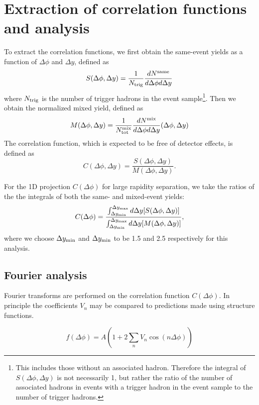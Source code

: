 \section{Extraction of correlation functions and analysis}\label{sec:corr}
To extract the correlation functions, we first obtain the same-event yields as a function of $\Delta \phi$ and $\Delta y$, defined as 
\begin{equation}
    S(\Delta\phi,\Delta y) = \frac{1}{N_{\rm trig}}\frac{dN^{\rm same}}{d\Delta \phi d\Delta y}
\end{equation}
where $N_{\rm trig}$ is the number of trigger hadrons in the event sample\footnote{This includes those without an associated hadron.  Therefore the integral of $S(\Delta\phi,\Delta y)$ is not necessarily 1, but rather the ratio of the number of associated hadrons in events with a trigger hadron in the event sample to the number of trigger hadrons.}.
Then we obtain the normalized mixed yield, defined as
\begin{equation}
    M(\Delta\phi,\Delta y) = \frac{1}{N^{\rm mix}_{\rm tot}}\frac{dN^{\rm mix}}{d\Delta \phi d\Delta y}(\Delta \phi,\Delta y)
\end{equation}
The correlation function, which is expected to be free of detector effects, is defined as 
\begin{equation}
    C(\Delta\phi,\Delta y) = \frac{S(\Delta\phi,\Delta y)}{M(\Delta\phi,\Delta y)}.
\end{equation}

For the 1D projection $C(\Delta\phi)$ for large rapidity separation, we take the ratios of the the integrals of both the same- and mixed-event yields:
\begin{equation}
    C(\Delta\phi) = \frac{\int_{\Delta y_{\rm min}}^{\Delta y_{\rm max}} d\Delta y  [S(\Delta\phi,\Delta y)]}{\int_{\Delta y_{\rm min}}^{\Delta y_{\rm max}} d\Delta y [M(\Delta\phi,\Delta y)]},
\end{equation}
where we choose $\Delta y_{\rm min}$ and $\Delta y_{\rm min}$ to be 1.5 and 2.5 respectively for this analysis.  
\subsection{Fourier analysis}
\label{sec:fourier}
Fourier transforms are performed on the correlation function $C(\Delta\phi)$.  In principle the coefficients $V_n$ may be compared to predictions made using structure functions.  

\begin{equation}
    f(\Delta\phi) = A(1+2\sum\limits_n V_n\cos (n\Delta\phi))
\end{equation}

